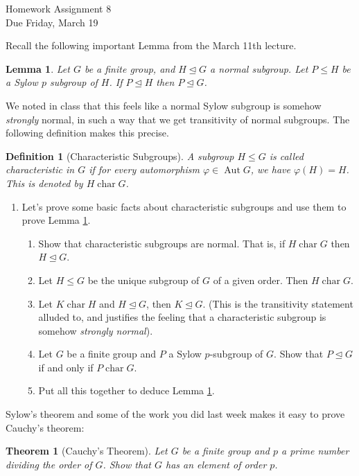 \documentclass[11pt]{article}
\newtheorem{theorem}{Theorem}
\newtheorem{lemma}{Lemma}
\newtheorem{definition}{Definition}
\newcommand{\Aut}{\operatorname{Aut}}
\newcommand{\ch}{\operatorname{char}}
\begin{document}
\begin{center}
\Large {Homework Assignment 8}\\
\small {Due Friday, March 19}
\end{center}
Recall the following important Lemma from the March 11th lecture.
\begin{lemma}\label{LemmaA}
  Let $G$ be a finite group, and $H\unlhd G$ a normal subgroup.  Let $P\le H$ be a Sylow $p$ subgroup of $H$.  If $P\unlhd H$ then $P\unlhd G$.
\end{lemma}
We noted in class that this feels like a normal Sylow subgroup is somehow \textit{strongly} normal, in such a way that we get transitivity of normal subgroups.  The following definition makes this precise.
\begin{definition}[Characteristic Subgroups]
  A subgroup $H\le G$ is called \textit{characteristic} in $G$ if for every automorphism $\varphi\in\Aut G$, we have $\varphi(H) = H$.  This is denoted by $H\ch G$.
\end{definition}
\begin{enumerate}
  \item{
  Let's prove some basic facts about characteristic subgroups and use them to prove Lemma \ref{LemmaA}.
  \begin{enumerate}
    \item{
    Show that characteristic subgroups are normal.  That is, if $H\ch G$ then $H\unlhd G$.
    }
    \item{
    Let $H\le G$ be the unique subgroup of $G$ of a given order.  Then $H\ch G$.
    }
    \item{
    Let $K\ch H$ and $H\unlhd G$, then $K\unlhd G$.  (This is the transitivity statement alluded to, and justifies the feeling that a characteristic subgroup is somehow \textit{strongly normal}).
    }
    \item{
    Let $G$ be a finite group and $P$ a Sylow $p$-subgroup of $G$.  Show that $P\unlhd G$ if and only if $P\ch G$.
    }
    \item{
    Put all this together to deduce Lemma \ref{LemmaA}.
    }
  \end{enumerate}
  }
\end{enumerate}
Sylow's theorem and some of the work you did last week makes it easy to prove Cauchy's theorem:
\begin{theorem}[Cauchy's Theorem]
  Let $G$ be a finite group and $p$ a prime number dividing the order of $G$.  Show that $G$ has an element of order $p$.
\end{theorem}
\end{document}
